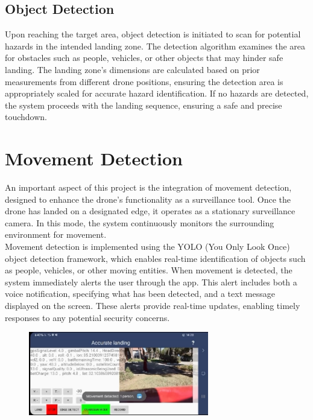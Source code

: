 \documentclass[3p,times]{elsarticle}
\begin{document}
\subsection{Object Detection}
Upon reaching the target area, object detection is initiated to scan for potential hazards in the intended landing zone. The detection algorithm examines the area for obstacles such as people, vehicles, or other objects that may hinder safe landing. The landing zone's dimensions are calculated based on prior measurements from different drone positions, ensuring the detection area is appropriately scaled for accurate hazard identification. If no hazards are detected, the system proceeds with the landing sequence, ensuring a safe and precise touchdown.

\section{Movement Detection}
An important aspect of this project is the integration of movement detection, designed to enhance the drone’s functionality as a surveillance tool. Once the drone has landed on a designated edge, it operates as a stationary surveillance camera. In this mode, the system continuously monitors the surrounding environment for movement.\\

Movement detection is implemented using the YOLO (You Only Look Once) object detection framework, which enables real-time identification of objects such as people, vehicles, or other moving entities. When movement is detected, the system immediately alerts the user through the app. This alert includes both a voice notification, specifying what has been detected, and a text message displayed on the screen. These alerts provide real-time updates, enabling timely responses to any potential security concerns.

\begin{figure}[H]
    \centering
    \includegraphics[width=0.7\textwidth]{movementDetect.jpeg}  %
    \label{fig:movementDetect.}
\end{figure}
\end{document}
